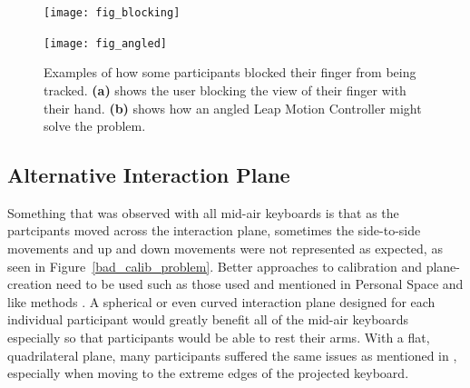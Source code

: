\begin{figure}[h]
	\centering
	\begin{minipage}[t]{2.5in}
		\texttt{[image: fig\_blocking]}
		\label{finger_blocked}
	\end{minipage}
	\begin{minipage}[t]{2.5in}
		\texttt{[image: fig\_angled]}
		\label{finger_seen}
	\end{minipage}
	\caption[Blocking Problem]{Examples of how some participants blocked their finger from being tracked. \textbf{(a)} shows the user blocking the view of their finger with their hand. \textbf{(b)} shows how an angled Leap Motion Controller might solve the problem.}
	\label{blocking problem}
\end{figure}

\subsection{Alternative Interaction Plane}
Something that was observed with all mid-air keyboards is that as the partcipants moved across the interaction plane, sometimes the side-to-side movements and up and down movements were not represented as expected, as seen in Figure~\ref{bad_calib_problem}. Better approaches to calibration and plane-creation need to be used such as those used and mentioned in Personal Space and like methods \cite{ref_alvin_thesis,ref_darren_thesis}. A spherical or even curved interaction plane designed for each individual participant would greatly benefit all of the mid-air keyboards especially so that participants would be able to rest their arms. With a flat, quadrilateral plane, many participants suffered the same issues as mentioned in \cite{ref_alvin_thesis}, especially when moving to the extreme edges of the projected keyboard.

